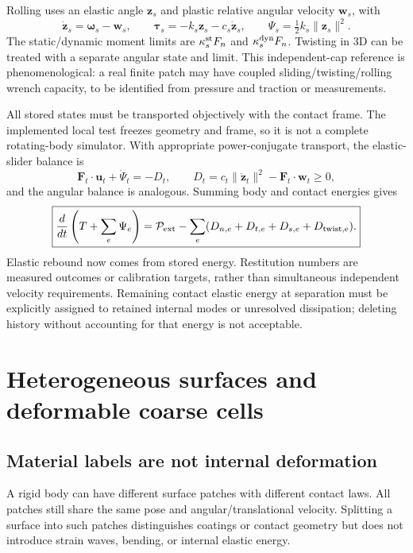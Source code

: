 \documentclass[11pt,a4paper]{article}
\newcommand{\bv}[1]{\bm{#1}}\newcommand{\inertia}{\mathbb I}
\begin{document}
Rolling uses an elastic angle $\bv z_s$ and plastic relative angular velocity $\bv w_s$, with
\begin{equation}
\dot{\bv z}_s=\bv\omega_s-\bv w_s,\qquad
\bv\tau_s=-k_s\bv z_s-c_s\dot{\bv z}_s,
\qquad \Psi_s=\tfrac12k_s\|\bv z_s\|^2.
\end{equation}
The static/dynamic moment limits are $\kappa_s^{\rm st}F_n$ and $\kappa_s^{\rm dyn}F_n$. Twisting in 3D can be treated with a separate angular state and limit. This independent-cap reference is phenomenological: a real finite patch may have coupled sliding/twisting/rolling wrench capacity, to be identified from pressure and traction or measurements.

All stored states must be transported objectively with the contact frame. The implemented local test freezes geometry and frame, so it is not a complete rotating-body simulator. With appropriate power-conjugate transport, the elastic-slider balance is
\begin{equation}
\bv F_t\cdot\bv u_t+\dot\Psi_t=-D_t,
\qquad D_t=c_t\|\dot{\bv z}_t\|^2-\bv F_t\cdot\bv w_t\geq0,
\end{equation}
and the angular balance is analogous. Summing body and contact energies gives
\begin{equation}
\boxed{\frac{d}{dt}\left(T+\sum_e\Psi_e\right)
=\mathcal P_{\rm ext}-\sum_e(D_{n,e}+D_{t,e}+D_{s,e}+D_{\rm twist,e}).}
\end{equation}
Elastic rebound now comes from stored energy. Restitution numbers are measured outcomes or calibration targets, rather than simultaneous independent velocity requirements. Remaining contact elastic energy at separation must be explicitly assigned to retained internal modes or unresolved dissipation; deleting history without accounting for that energy is not acceptable.

\section{Heterogeneous surfaces and deformable coarse cells}
\subsection{Material labels are not internal deformation}
A rigid body can have different surface patches with different contact laws. All patches still share the same pose and angular/translational velocity. Splitting a surface into such patches distinguishes coatings or contact geometry but does not introduce strain waves, bending, or internal elastic energy.
\end{document}
